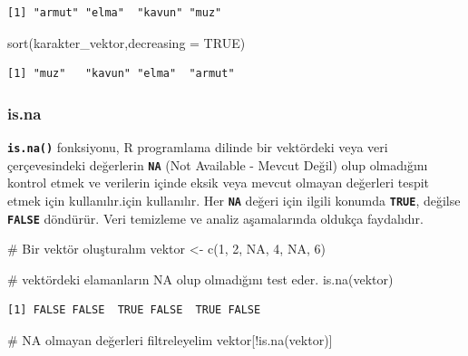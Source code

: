 \documentclass[
  letterpaper,
  DIV=11,
  numbers=noendperiod]{scrreprt}
\newenvironment{Shaded}{\begin{snugshade}}{\end{snugshade}}
\newcommand{\AttributeTok}[1]{\textcolor[rgb]{0.40,0.45,0.13}{#1}}
\newcommand{\CommentTok}[1]{\textcolor[rgb]{0.37,0.37,0.37}{#1}}
\newcommand{\ConstantTok}[1]{\textcolor[rgb]{0.56,0.35,0.01}{#1}}
\newcommand{\DecValTok}[1]{\textcolor[rgb]{0.68,0.00,0.00}{#1}}
\newcommand{\FunctionTok}[1]{\textcolor[rgb]{0.28,0.35,0.67}{#1}}
\newcommand{\NormalTok}[1]{\textcolor[rgb]{0.00,0.23,0.31}{#1}}
\newcommand{\OtherTok}[1]{\textcolor[rgb]{0.00,0.23,0.31}{#1}}
\newcommand{\SpecialCharTok}[1]{\textcolor[rgb]{0.37,0.37,0.37}{#1}}
\begin{document}
\begin{verbatim}
[1] "armut" "elma"  "kavun" "muz"  
\end{verbatim}

\begin{Shaded}
\begin{Highlighting}[]
\FunctionTok{sort}\NormalTok{(karakter\_vektor,}\AttributeTok{decreasing =} \ConstantTok{TRUE}\NormalTok{) }
\end{Highlighting}
\end{Shaded}

\begin{verbatim}
[1] "muz"   "kavun" "elma"  "armut"
\end{verbatim}

\subsubsection{\texorpdfstring{\textbf{is.na}}{is.na}}\label{is.na}

\textbf{\texttt{is.na()}} fonksiyonu, R programlama dilinde bir
vektördeki veya veri çerçevesindeki değerlerin \textbf{\texttt{NA}} (Not
Available - Mevcut Değil) olup olmadığını kontrol etmek ve verilerin
içinde eksik veya mevcut olmayan değerleri tespit etmek için
kullanılır.için kullanılır. Her \textbf{\texttt{NA}} değeri için ilgili
konumda \textbf{\texttt{TRUE}}, değilse \textbf{\texttt{FALSE}}
döndürür. Veri temizleme ve analiz aşamalarında oldukça faydalıdır.

\begin{Shaded}
\begin{Highlighting}[]
\CommentTok{\# Bir vektör oluşturalım}
\NormalTok{vektor }\OtherTok{\textless{}{-}} \FunctionTok{c}\NormalTok{(}\DecValTok{1}\NormalTok{, }\DecValTok{2}\NormalTok{, }\ConstantTok{NA}\NormalTok{, }\DecValTok{4}\NormalTok{, }\ConstantTok{NA}\NormalTok{, }\DecValTok{6}\NormalTok{)}

\CommentTok{\# vektördeki elamanların NA olup olmadığını test eder.}
\FunctionTok{is.na}\NormalTok{(vektor)}
\end{Highlighting}
\end{Shaded}

\begin{verbatim}
[1] FALSE FALSE  TRUE FALSE  TRUE FALSE
\end{verbatim}

\begin{Shaded}
\begin{Highlighting}[]
\CommentTok{\# NA olmayan değerleri filtreleyelim}
\NormalTok{vektor[}\SpecialCharTok{!}\FunctionTok{is.na}\NormalTok{(vektor)]}
\end{Highlighting}
\end{Shaded}
\end{document}
